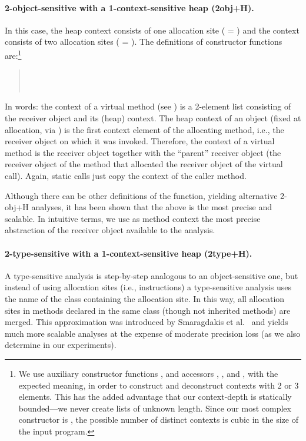 \paragraph{2-object-sensitive with a 1-context-sensitive heap (2obj+H).}
In this case, the heap context consists of one allocation site ( = ) and the context consists of two allocation sites ( = ). The definitions of constructor functions are:\footnote{We use auxiliary constructor functions ,  and accessors , , and , with the expected meaning, in order to construct and deconstruct contexts with 2 or 3 elements. This has the added advantage that our context-depth is statically bounded---we never create lists of unknown length. Since our most complex constructor is , the possible number of distinct contexts is cubic in the size of the input program.}

\begin{quote}
 \\
 \\
\end{quote}

In words: the context of a virtual method (see ) is a 2-element list consisting of the receiver object and its (heap) context. The heap context of an object (fixed at allocation, via ) is the first context element of the allocating method, i.e., the receiver object on which it was invoked. Therefore, the context of a virtual method is the receiver object together with the ``parent'' receiver object (the receiver object of the method that allocated the receiver object of the virtual call). Again, static calls just copy the context of the caller method.

Although there can be other definitions of the  function, yielding alternative 2-obj+H analyses, it has been shown \cite{popl:2011:Smaragdakis} that the above is the most precise and scalable. In intuitive terms, we use as method context the most precise abstraction of the receiver object available to the analysis.

\paragraph{2-type-sensitive with a 1-context-sensitive heap (2type+H).}
A type-sensitive analysis is step-by-step analogous to an object-sensitive one, but instead of using allocation sites (i.e., instructions) a type-sensitive analysis uses the name of the class containing the allocation site. In this way, all allocation sites in methods declared in the same class (though not inherited methods) are merged. This approximation was introduced by Smaragdakis et al.~\cite{popl:2011:Smaragdakis} and yields much more scalable analyses at the expense of moderate precision loss (as we also determine in our experiments).


